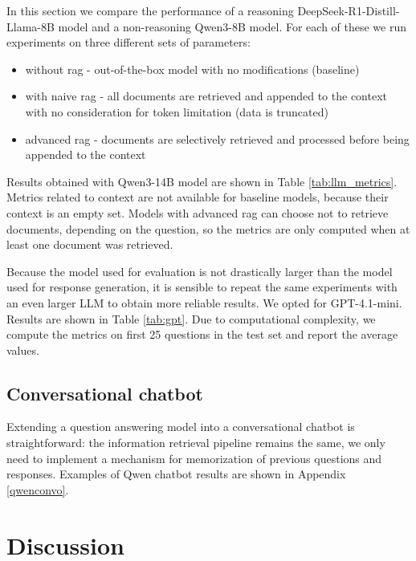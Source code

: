 \documentclass[fleqn,moreauthors,10pt]{ds_report}
\begin{document}
In this section we compare the performance of a reasoning DeepSeek-R1-Distill-Llama-8B \cite{deepseek3} model and a non-reasoning Qwen3-8B \cite{qwen3} model. For each of these we run experiments on three different sets of parameters:
\begin{itemize}
	\item without \ac{rag} - out-of-the-box model with no modifications (baseline)
	\item with naive \ac{rag} - all documents are retrieved and appended to the context with no consideration for token limitation (data is truncated)
	\item advanced \ac{rag} - documents are selectively retrieved and processed before being appended to the context
\end{itemize}

Results obtained with Qwen3-14B model are shown in Table \ref{tab:llm_metrics}. Metrics related to context are not available for baseline models, because their context is an empty set. Models with advanced \ac{rag} can choose not to retrieve documents, depending on the question, so the metrics are only computed when at least one document was retrieved. 

Because the model used for evaluation is not drastically larger than the model used for response generation, it is sensible to repeat the same experiments with an even larger LLM to obtain more reliable results. We opted for GPT-4.1-mini. Results are shown in Table \ref{tab:gpt}. Due to computational complexity, we compute the metrics on first 25 questions in the test set and report the average values. 



\subsection*{Conversational chatbot}

Extending a question answering model into a conversational chatbot is straightforward: the information retrieval pipeline remains the same, we only need to implement a mechanism for memorization of previous questions and responses. Examples of Qwen chatbot results are shown in Appendix \ref{qwenconvo}.



\section*{Discussion}
\end{document}
